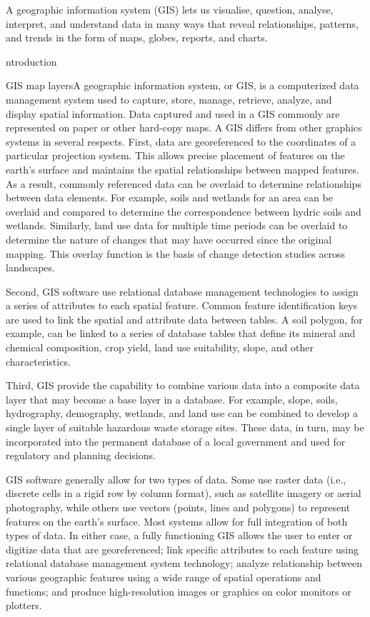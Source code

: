 
A geographic information system (GIS) lets us visualise, question, analyse, interpret, and understand data in many ways that reveal relationships, patterns, and trends in the form of maps, globes, reports, and charts.


ntroduction

GIS map layersA geographic information system, or GIS, is a computerized data management system used to capture, store, manage, retrieve, analyze, and display spatial information. Data captured and used in a GIS commonly are represented on paper or other hard-copy maps. A GIS differs from other graphics systems in several respects. First, data are georeferenced to the coordinates of a particular projection system. This allows precise placement of features on the earth’s surface and maintains the spatial relationships between mapped features. As a result, commonly referenced data can be overlaid to determine relationships between data elements. For example, soils and wetlands for an area can be overlaid and compared to determine the correspondence between hydric soils and wetlands. Similarly, land use data for multiple time periods can be overlaid to determine the nature of changes that may have occurred since the original mapping. This overlay function is the basis of change detection studies across landscapes.

Second, GIS software use relational database management technologies to assign a series of attributes to each spatial feature. Common feature identification keys are used to link the spatial and attribute data between tables. A soil polygon, for example, can be linked to a series of database tables that define its mineral and chemical composition, crop yield, land use suitability, slope, and other characteristics.

Third, GIS provide the capability to combine various data into a composite data layer that may become a base layer in a database. For example, slope, soils, hydrography, demography, wetlands, and land use can be combined to develop a single layer of suitable hazardous waste storage sites. These data, in turn, may be incorporated into the permanent database of a local government and used for regulatory and planning decisions.

GIS software generally allow for two types of data. Some use raster data (i.e., discrete cells in a rigid row by column format), such as satellite imagery or aerial photography, while others use vectors (points, lines and polygons) to represent features on the earth’s surface. Most systems allow for full integration of both types of data. In either case, a fully functioning GIS allows the user to enter or digitize data that are georeferenced; link specific attributes to each feature using relational database management system technology; analyze relationship between various geographic features using a wide range of spatial operations and functions; and produce high-resolution images or graphics on color monitors or plotters.


